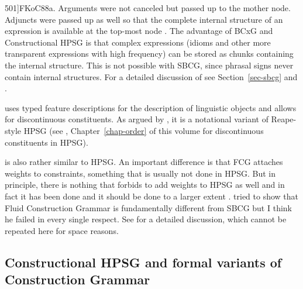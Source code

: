 \documentclass[output=paper]{langsci/langscibook}
\begin{document}
  501]{FKoC88a}. Arguments were not canceled but
passed up to the mother node. Adjuncts were passed up as well so that the complete internal
structure of an expression is available at the top-most node \citep[]{KF99a}. The advantage of BCxG and
Constructional HPSG \citep{Sag97a} is that complex expressions (\eg idioms and other more transparent expressions
with high frequency) can be stored as chunks containing the internal structure. This is not possible
with SBCG, since phrasal signs never contain internal structures. For a detailed discussion of \sbcg
see Section~\ref{sec-sbcg} and .

 \citep{BC2005a} uses typed feature descriptions for the description of
linguistic objects and allows for discontinuous constituents. As
argued by \citet[Section~10.6.3]{MuellerGT-Eng1}, it is a notational variant of Reape-style HPSG
\citep{Reape94a} (see \citealt[Section~\ref{sec-domains}]{chapters/order}, Chapter~\ref{chap-order}
of this volume for discontinuous constituents in HPSG).

 is also rather similar to HPSG. An important difference is that FCG attaches
weights to constraints, something that is usually not done in HPSG. But in principle, there is
nothing that forbids to add weights to HPSG as well and in fact it has been done \citep{Brew95a,BC99a,MT2008a-u} and it should be
done to a larger extent \citep{Miller2013a}.  tried to show that
Fluid Construction Grammar is fundamentally different from SBCG but I think he failed in every
single respect. See  for a detailed discussion, which cannot be repeated here for
space reasons.




\subsection{Constructional HPSG and formal variants of Construction Grammar}
\end{document}
